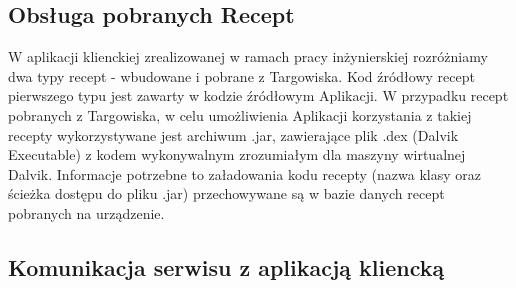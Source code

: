 \documentclass[11pt,a4paper,polish,thesis]{dcsbook}
\begin{document}
\subsection {Obsługa pobranych  Recept}
W aplikacji klienckiej zrealizowanej w ramach pracy inżynierskiej rozróżniamy dwa typy recept - wbudowane i pobrane z Targowiska. Kod źródłowy recept pierwszego typu jest zawarty w kodzie źródłowym Aplikacji. W przypadku recept pobranych z Targowiska, w celu umożliwienia Aplikacji korzystania z takiej recepty wykorzystywane jest archiwum .jar, zawierające plik .dex (Dalvik Executable) z kodem wykonywalnym  zrozumiałym dla maszyny wirtualnej Dalvik. Informacje potrzebne to załadowania kodu recepty (nazwa klasy oraz ścieżka dostępu do pliku .jar) przechowywane są w bazie danych recept pobranych na urządzenie. 
\subsection{Komunikacja serwisu z aplikacją kliencką}
\end{document}
